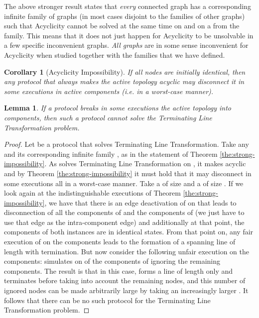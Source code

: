 \documentclass[preprint]{elsarticle}
\newtheorem{lemma}{Lemma}
\newtheorem{corollary}{Corollary}
\begin{document}
The above stronger result states that \emph{every} connected graph  has a corresponding infinite family of graphs (in most cases disjoint to
the families of other graphs) such that Acyclicity cannot be solved at the same time on  and on a  from the family. This means that it does not just happen for Acyclicity to be unsolvable in a few specific inconvenient graphs. \emph{All graphs} are in some sense 
inconvenient for Acyclicity when studied together with the families that we have defined.

\begin{corollary} [Acyclicity Impossibility] \label{cor:acyclicity-impossibility}
If all nodes are initially identical, then any protocol that always makes the active topology acyclic may disconnect it in some executions in  active components (i.e. in a worst-case manner).
\end{corollary}

\begin{lemma} \label{lem:line-impossibility}
If a protocol breaks in some executions the active topology into  components, then such a protocol cannot solve the Terminating Line Transformation problem.
\end{lemma}
\begin{proof}
Let  be a protocol that solves Terminating Line Transformation. Take any  and its corresponding infinite family , as in the statement of Theorem \ref{the:strong-impossibility}. As  solves Terminating Line Transformation on , it makes  acyclic and by Theorem \ref{the:strong-impossibility} it must hold that it may disconnect in some executions all  in a worst-case manner. Take a  of size  and a  of size . If we look again at the indistinguishable executions of Theorem \ref{the:strong-impossibility}, we have that there is an edge deactivation of  on  that leads to disconnection of all the  components of  and the  components of  (we just have to use that edge as the intra-component edge) and additionally at that point, the components of both instances are in identical states. From that point on, any fair execution  of  on the  components leads to the formation of a spanning line of length  with termination. But now consider the following unfair execution  on the  components:  simulates  on  of the  components of  ignoring the remaining  components. The result is that in this case,  forms a line of length only  and terminates before taking into account the remaining  nodes, and this number of ignored nodes can be made arbitrarily large by taking an increasingly larger . It follows that there can be no such protocol  for the Terminating Line Transformation problem.
\end{proof}
\end{document}
